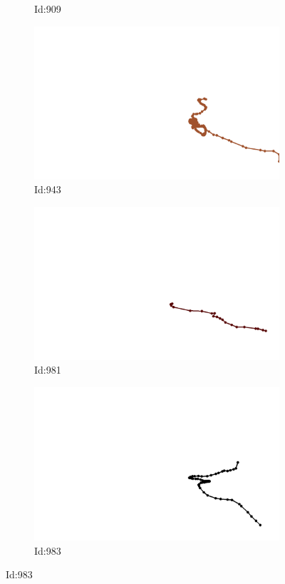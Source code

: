 \documentclass[12pt,twoside]{report}
\begin{document}
\begin{figure}
\begin{subfigure}[b]{0.20\textwidth}
\caption{Id:909}
\end{subfigure}
\begin{subfigure}[b]{0.20\textwidth}
\centering
\includegraphics[width=\textwidth]{../trajectories/943.png}
\caption{Id:943}
\end{subfigure}
\begin{subfigure}[b]{0.20\textwidth}
\centering
\includegraphics[width=\textwidth]{../trajectories/981.png}
\caption{Id:981}
\end{subfigure}
\begin{subfigure}[b]{0.20\textwidth}
\centering
\includegraphics[width=\textwidth]{../trajectories/983.png}
\caption{Id:983}
\end{subfigure}
\end{figure}
\end{document}
